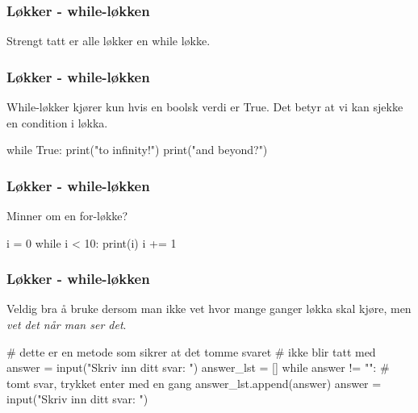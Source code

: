 
\begin{frame}
    \frametitle{Løkker - while-løkken}

    Strengt tatt er alle løkker en while løkke. 

\end{frame}

\begin{frame}[fragile]
    \frametitle{Løkker - while-løkken}

    While-løkker kjører kun hvis en boolsk verdi er True. Det betyr at vi kan sjekke en condition i løkka. 

\begin{python}
while True:
    print("to infinity!")
print("and beyond?")
\end{python}

\end{frame}

\begin{frame}[fragile]
    \frametitle{Løkker - while-løkken}

    Minner om en for-løkke? 

\begin{python}
i = 0
while i < 10:
    print(i)
    i += 1
\end{python}

\end{frame}

\begin{frame}[fragile]
    \frametitle{Løkker - while-løkken}

    Veldig bra å bruke dersom man ikke vet hvor mange ganger løkka skal kjøre, men \textit{vet det når man ser det}. 

\begin{python}
# dette er en metode som sikrer at det tomme svaret 
# ikke blir tatt med
answer = input("Skriv inn ditt svar: ")
answer_lst = []
while answer != "": # tomt svar, trykket enter med en gang 
    answer_lst.append(answer) 
    answer = input("Skriv inn ditt svar: ")
\end{python}

\end{frame}
